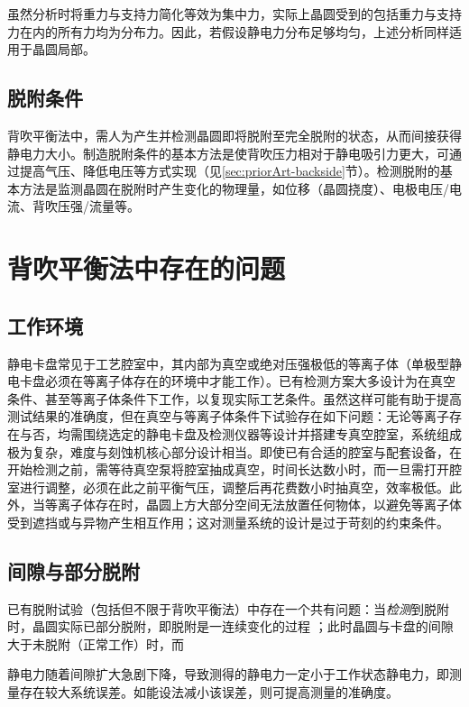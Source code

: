 虽然分析时将重力与支持力简化等效为集中力，实际上晶圆受到的包括重力与支持力在内的所有力均为分布力。因此，若假设静电力分布足够均匀，上述分析同样适用于晶圆局部。


\subsection{脱附条件}\label{sec:principle-backside-dechuck}

背吹平衡法中，需人为产生并检测晶圆即将脱附至完全脱附的状态，从而间接获得静电力大小。制造脱附条件的基本方法是使背吹压力相对于静电吸引力更大，可通过提高气压、降低电压等方式实现（见\ref{sec:priorArt-backside}节）。检测脱附的基本方法是监测晶圆在脱附时产生变化的物理量，如位移（晶圆挠度）、电极电压/电流、背吹压强/流量等。%



\clearpage



\section{背吹平衡法中存在的问题}\label{sec:principle-prob}


\subsection{工作环境}\label{sec:principle-prob-env}

静电卡盘常见于工艺腔室中，其内部为真空或绝对压强极低的等离子体（单极型静电卡盘必须在等离子体存在的环境中才能工作）。已有检测方案大多设计为在真空条件、甚至等离子体条件下工作，以复现实际工艺条件。虽然这样可能有助于提高测试结果的准确度，但在真空与等离子体条件下试验存在如下问题：无论等离子存在与否，均需围绕选定的静电卡盘及检测仪器等设计并搭建专真空腔室，系统组成极为复杂，难度与刻蚀机核心部分设计相当。即使已有合适的腔室与配套设备，在开始检测之前，需等待真空泵将腔室抽成真空，时间长达数小时，而一旦需打开腔室进行调整，必须在此之前平衡气压，调整后再花费数小时抽真空，效率极低。此外，当等离子体存在时，晶圆上方大部分空间无法放置任何物体，以避免等离子体受到遮挡或与异物产生相互作用；这对测量系统的设计是过于苛刻的约束条件。


\subsection{间隙与部分脱附}\label{principle-prob-gap}

已有脱附试验（包括但不限于背吹平衡法）中存在一个共有问题：当\emph{检测}到脱附时，晶圆实际已部分脱附，即脱附是一连续变化的过程 %
；此时晶圆与卡盘的间隙大于未脱附（正常工作）时，而%
\begin{comment}
根据，
\end{comment}
静电力随着间隙扩大急剧下降，导致测得的静电力一定小于工作状态静电力，即测量存在较大系统误差。如能设法减小该误差，则可提高测量的准确度。

